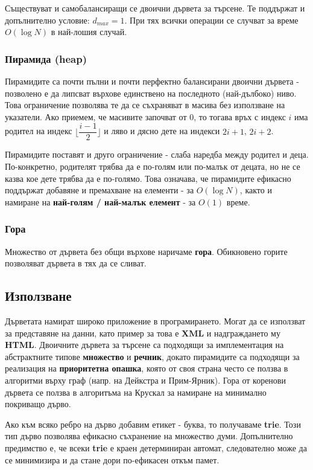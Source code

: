 \documentclass[fleqn,12pt]{article}
\begin{document}
Съществуват и самобалансиращи се двоични дървета за търсене. Те поддържат и допълнително условие: $d_{max} = 1$. При тях всички операции
се случват за време $O(\log N)$ в най-лошия случай. 

\subsubsection{Пирамида (heap)}
\label{trees:heap}
Пирамидите са почти пълни и почти перфектно балансирани двоични дървета - позволено е да липсват върхове единствено на последното (най-дълбоко) ниво.
Това ограничение позволява те да се съхраняват в масива без използване на указатели. Ако приемем, че масивите започват от 0, то тогава 
връх с индекс $i$ има родител на индекс $\Bigg\lfloor \dfrac{i - 1}{2} \Bigg\rfloor$ и ляво и дясно дете на индекси $2i + 1$, $2i + 2$.

Пирамидите поставят и друго ограничение - слаба наредба между родител и деца. По-конкретно, родителят трябва да е по-голям или по-малък
от децата, но не се казва кое дете трябва да е по-голямо. Това означава, че пирамидите ефикасно поддържат добавяне и премахване на елементи - за $O(\log N)$,
както и намиране на \textbf{най-голям / най-малък елемент} - за $O(1)$ време.

\subsubsection{Гора}
Множество от дървета без общи върхове наричаме \textbf{гора}. Обикновено горите позволяват дървета в тях да се сливат.

\subsection{Използване}
Дърветата намират широко приложение в програмирането. Могат да се използват за представяне на данни, като пример за това е \textbf{XML}
и надграждането му \textbf{HTML}. Двоичните дървета за търсене са подходящи за имплементация на абстрактните типове \textbf{множество} и \textbf{речник},
докато пирамидите са подходящи за реализация на \textbf{приоритетна опашка}, която от своя страна често се ползва в алгоритми върху граф (напр. на Дейкстра и Прим-Ярник).
Гора от коренови дървета се ползва в алгоритъма на Крускал за намиране на минимално покриващо дърво.

Ако към всяко ребро на дърво добавим етикет - буква, то получаваме \textbf{trie}. Този тип дърво позволява ефикасно съхранение на множество думи.
Допълнително предимство е, че всеки \textbf{trie} е краен детерминиран автомат, следователно може да се минимизира и да стане дори по-ефикасен откъм памет.
\end{document}
